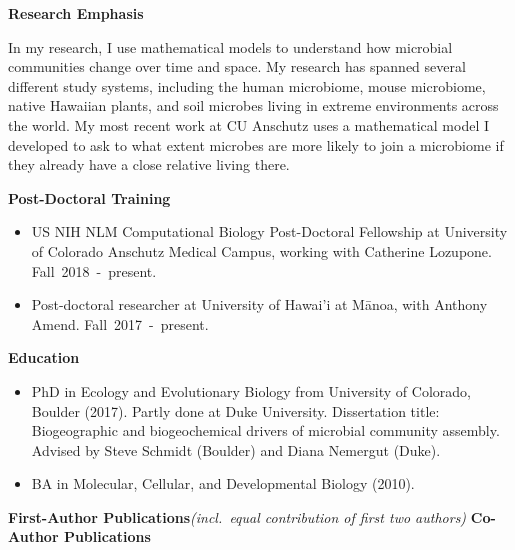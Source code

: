 \documentclass{article}
\begin{document}
%
\vspace{2mm}
%
{\large\textbf{Research Emphasis}}
\begin{adjustwidth}{5mm}{}
  In my research, I use mathematical models to understand how microbial communities change over time and space. My research has spanned several different study systems, including the human microbiome, mouse microbiome, native Hawaiian plants, and soil microbes living in extreme environments across the world. My most recent work at CU Anschutz uses a mathematical model I developed to ask to what extent microbes are more likely to join a microbiome if they already have a close relative living there.
\end{adjustwidth}
%
\vspace{2mm}
%
{\large  \textbf{Post-Doctoral Training}}
\begin{itemize}[noitemsep,topsep=0pt, leftmargin=5mm]
  \item US NIH NLM Computational Biology Post-Doctoral Fellowship at University of Colorado Anschutz Medical Campus, working with Catherine Lozupone. \mbox{Fall 2018 - present.}
  \item Post-doctoral researcher at University of Hawai'i at Mānoa, with Anthony Amend. \mbox{Fall 2017 - present.}
\end{itemize}
%
\vspace{2mm}
{\large  \textbf{Education}}
\begin{itemize}[noitemsep,topsep=0pt, leftmargin=5mm]
  \item PhD in Ecology and Evolutionary Biology from University of Colorado, Boulder (2017). Partly done at Duke University. Dissertation title: Biogeographic and biogeochemical drivers of microbial community assembly. Advised by Steve Schmidt (Boulder) and Diana Nemergut (Duke). 
  \item BA in Molecular, Cellular, and Developmental Biology (2010).
\end{itemize}
%
\vspace{2mm}
{\large  \textbf{First-Author Publications}}\space\emph{(incl.\ equal contribution of first two authors)}
\vspace{-1em}\vspace{1mm}
\begingroup
	\setlength\bibitemsep{0pt}
	\nocite{*}
	\printbibliography[keyword=firstauthor, heading=none]
\endgroup
%
\vspace{-1em}\vspace{3mm}
{\large  \textbf{Co-Author Publications}}
\vspace{-1em}\vspace{1mm}
\end{document}
